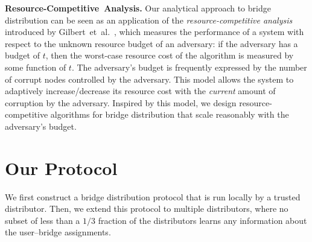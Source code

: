 \documentclass{llncs}
\newcommand{\etal}{et~al.}
\newcommand{\sfsize}{\fontsize{0.73\baselineskip}{0.73\baselineskip}\selectfont}
\newcommand{\sans}[1]{\textsf{\sfsize \mbox{#1}}}
\newcommand{\sansb}[1]{\textbf{\sans{\mbox{#1}}}}
\newcommand{\para}[1]{\vspace{0.55em} \noindent \sansb{{\mbox{#1}}}}
\begin{document}


\para{Resource-Competitive Analysis.} Our analytical approach to bridge distribution can be seen as an application of the \emph{resource-competitive analysis} introduced by Gilbert~\etal~\cite{Gilbert:2012:RAN:2335470.2335471,Bender:2015:SIGACT}, which measures the performance of a system with respect to the unknown resource budget of an adversary: if the adversary has a budget of $t$, then the worst-case resource cost of the algorithm is measured by some function of $t$. The adversary's budget is frequently expressed by the number of corrupt nodes controlled by the adversary. This model allows the system to adaptively increase/decrease its resource cost with the \emph{current} amount of corruption by the adversary. Inspired by this model, we design resource-competitive algorithms for bridge distribution that scale reasonably with the adversary's budget.

\section{Our Protocol} \label{sec:algorithm} 
We first construct a bridge distribution protocol that is run locally by a trusted distributor. Then, we extend this protocol to multiple distributors, where no subset of less than a $1/3$ fraction of the distributors learns any information about the user--bridge assignments.
\end{document}
